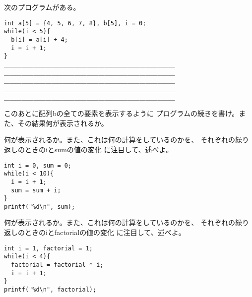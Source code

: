 \documentclass[12pt,a4j]{jarticle}
\newcounter{toi}
\def\toi{%
\bigskip\bigskip\noindent
\addtocounter{toi}{1}
\shadowbox{\bfseries\large 問\thetoi}
\nopagebreak[4]\bigskip\nopagebreak[4]
}
\begin{document}
\toi


次のプログラムがある。
\begin{verbatim}
int a[5] = {4, 5, 6, 7, 8}, b[5], i = 0;
while(i < 5){
  b[i] = a[i] + 4;
  i = i + 1;
}
＿＿＿＿＿＿＿＿＿＿＿＿＿＿＿＿＿＿＿＿＿＿＿＿＿＿＿＿＿
＿＿＿＿＿＿＿＿＿＿＿＿＿＿＿＿＿＿＿＿＿＿＿＿＿＿＿＿＿
＿＿＿＿＿＿＿＿＿＿＿＿＿＿＿＿＿＿＿＿＿＿＿＿＿＿＿＿＿
＿＿＿＿＿＿＿＿＿＿＿＿＿＿＿＿＿＿＿＿＿＿＿＿＿＿＿＿＿
＿＿＿＿＿＿＿＿＿＿＿＿＿＿＿＿＿＿＿＿＿＿＿＿＿＿＿＿＿
\end{verbatim}
このあとに配列{\ttfamily b}の全ての要素を表示するように
プログラムの続きを書け。また、その結果何が表示されるか。








\toi
\label{toi:whilesum}

何が表示されるか。また、これは何の計算をしているのかを、
それぞれの繰り返しのときの{\ttfamily iとsum}の値の変化
に注目して、述べよ。

\begin{verbatim}
int i = 0, sum = 0;
while(i < 10){
  i = i + 1;
  sum = sum + i;
}
printf("%d\n", sum);
\end{verbatim}







\toi


何が表示されるか。また、これは何の計算をしているのかを、
それぞれの繰り返しのときの{\ttfamily iとfactorial}の値の変化
に注目して、述べよ。
\begin{verbatim}
int i = 1, factorial = 1;
while(i < 4){
  factorial = factorial * i;
  i = i + 1;
}
printf("%d\n", factorial);
\end{verbatim}
\end{document}
